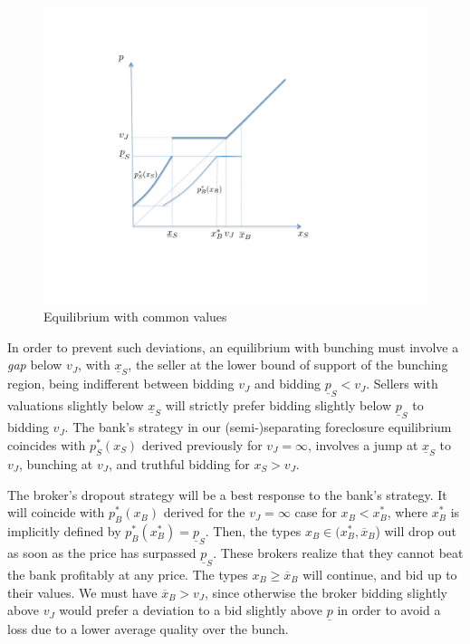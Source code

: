 \documentclass[11pt,twopage]{article}
\newcommand{\ol}{\overline}
\newcommand{\ul}{\underline}
\begin{document}
\begin{figure}[tf]
  \centering
  \includegraphics[scale = 0.6]{graphics/eqm_common.pdf}
  \caption{Equilibrium with common values}
  \label{fig:eqm_common}
\end{figure}

In order to prevent such deviations, an equilibrium with bunching must involve a \emph{gap} below $v_J$, with $\underline x_S$, the seller at the lower bound of support of the bunching region, being indifferent between bidding $v_J$ and bidding $\ul p_S<v_J$. Sellers with valuations slightly below $\ul x_S$ will strictly prefer bidding slightly below $\ul p_S$ to bidding $v_J$.
 The bank's strategy in our (semi-)separating foreclosure equilibrium coincides with $p_S^*(x_S)$ derived previously for $v_J=\infty$, involves a jump at $\ul x_S$ to $v_J$, bunching at $v_J$, and truthful bidding for $x_S > v_J$.

The broker's dropout strategy will be a best response to the bank's strategy. It will coincide with $p_B^*(x_B)$ derived for the $v_J=\infty$ case for $x_B < x_B^*$, where $x_B^*$ is implicitly defined by $p_B^*(x_B^*)=\ul p_S$. Then, the types $x_B \in (x_B^*,\ol x_B$) will drop out as soon as the price has surpassed $\ul p_S$. These brokers realize that they cannot beat the bank profitably at any price. The types $x_B \geq \ol x_B$ will continue, and bid up to their values. We must have $\ol x_B > v_J$, since otherwise the broker bidding slightly above $v_J$ would prefer a deviation to a bid slightly above $\ul p$ in order to avoid a loss due to a lower average quality over the bunch. 
\end{document}

